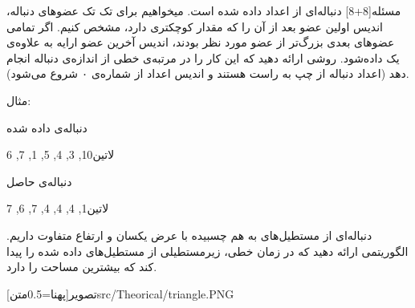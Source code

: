 
‌مسئله[8+8]
دنباله‌ای از اعداد داده شده است. میخواهیم برای تک تک عضو‌های دنباله، اندیس اولین عضو بعد از آن را که مقدار کوچکتری دارد، مشخص کنیم. اگر تمامی عضوهای بعدی بزرگ‌تر از عضو مورد نظر بودند، اندیس آخرین عضو ارایه به علاوه‌ی یک داده‌شود. روشی ارائه دهید که این کار را در مرتبه‌ی خطی از اندازه‌ی دنباله انجام دهد (اعداد دنباله از چپ به راست هستند و اندیس اعداد از شماره‌ی ۰ شروع می‌شود).

مثال:

‌دنباله‌ی داده شده
\begin{center}
‌لاتین{10, 3, 4, 5, 1, 7, 6}
\end{center}

دنباله‌ی حاصل
\begin{center}
‌لاتین{1, 4, 4, 4, 7, 6, 7}
\end{center}

دنباله‌ای از مستطیل‌های به هم چسبیده‌ با عرض یکسان و ارتفاع متفاوت داریم. الگوریتمی ارائه دهید که در زمان خطی، زیرمستطیلی از مستطیل‌های داده شده را پیدا کند که بیشترین مساحت را دارد.

\begin{center}
‌تصویر[پهنا=0.5‌متن]{src/Theorical/triangle.PNG}
\end{center}












